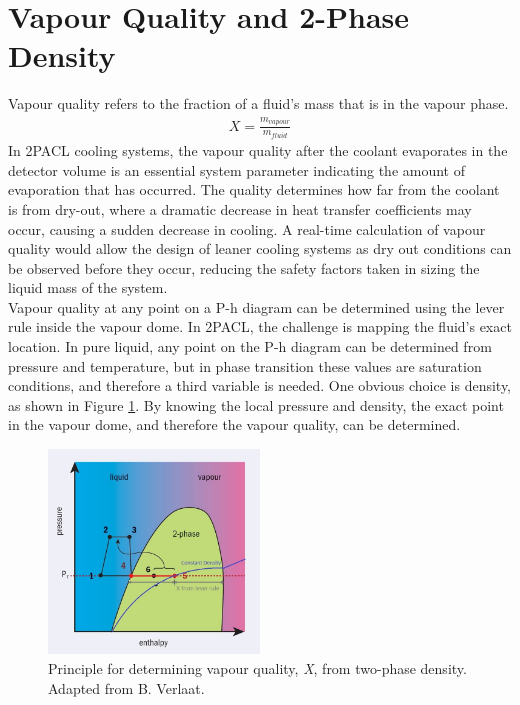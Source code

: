 \documentclass{report}
\begin{document}
\section{Vapour Quality and 2-Phase Density}
Vapour quality refers to the fraction of a fluid's mass that is in the vapour phase.
\begin{eqnarray}
X=\frac{m_{vapour}}{m_{fluid}}
\end{eqnarray}
In 2PACL cooling systems, the vapour quality after the coolant evaporates in the detector volume is an essential system parameter indicating the amount of evaporation that has occurred. The quality determines how far from the coolant is from dry-out, where a dramatic decrease in heat transfer coefficients may occur, causing a sudden decrease in cooling. A real-time calculation of vapour quality would allow the design of leaner cooling systems as dry out conditions can be observed before they occur, reducing the safety factors taken in sizing the liquid mass of the system.\\
Vapour quality at any point on a P-h diagram can be determined using the lever rule inside the vapour dome. In 2PACL, the challenge is mapping the fluid's exact location. In pure liquid, any point on the P-h diagram can be determined from pressure and temperature, but in phase transition these values are saturation conditions, and therefore a third variable is needed. One obvious choice is density, as shown in Figure \ref{fig:densityMethod}. By knowing the local pressure and density, the exact point in the vapour dome, and therefore the vapour quality, can be determined. 

\begin{figure}
\includegraphics[width=0.5\textwidth]{densityMethod.jpg}
\caption{Principle for determining vapour quality, \textit{X}, from two-phase density. Adapted from B. Verlaat. \cite{CERN courier}}
\label{fig:densityMethod}
\end{figure}
\end{document}

